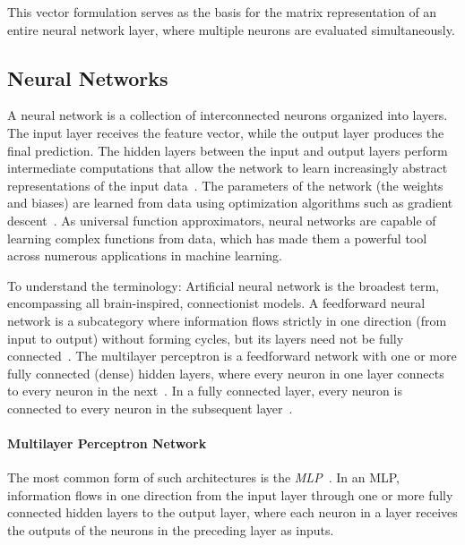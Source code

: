 This vector formulation serves as the basis for the matrix representation of an entire neural network layer, where multiple neurons are evaluated simultaneously.

\subsection{Neural Networks}
A neural network is a collection of interconnected neurons organized into layers. 
The input layer receives the feature vector, while the output layer produces the final prediction. The hidden layers between the input and output layers perform intermediate computations that allow the network to learn increasingly abstract representations of the input data~\cite{Goodfellow-et-al-2016}.
The parameters of the network (the weights and biases) are learned from data using optimization algorithms such as gradient descent~\cite{Rumelhart1986LearningRB}. As universal function approximators, neural networks are capable of learning complex functions from data, which has made them a powerful tool across numerous applications in machine learning.


To understand the terminology: Artificial neural network is the broadest term, encompassing all brain-inspired, connectionist models. A feedforward neural network is a subcategory where information flows strictly in one direction (from input to output) without forming cycles, but its layers need not be fully connected~\cite{Goodfellow-et-al-2016}. The multilayer perceptron is a feedforward network with one or more fully connected (dense) hidden layers, where every neuron in one layer connects to every neuron in the next~\cite{Goodfellow-et-al-2016}. In a fully connected layer, every neuron is connected to every neuron in the subsequent layer~\cite{Goodfellow-et-al-2016}.


\paragraph{Multilayer Perceptron Network}
The most common form of such architectures is the \textit{\acf{MLP}}~\cite{Goodfellow-et-al-2016}. In an \ac{MLP}, information flows in one direction from the input layer through one or more fully connected hidden layers to the output layer, where each neuron in a layer receives the outputs of the neurons in the preceding layer as inputs. 

